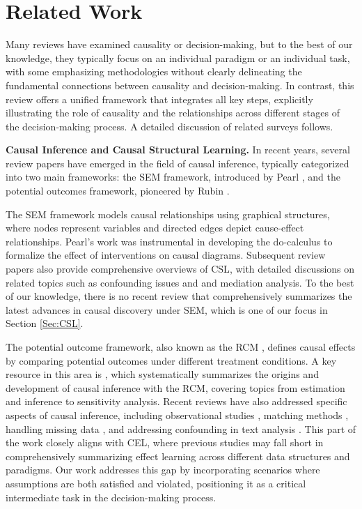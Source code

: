 \section{Related Work}
\label{sec::related_work}
Many reviews have examined causality or decision-making, but to the best of our knowledge, they typically focus on an individual paradigm or an individual task, with some emphasizing methodologies without clearly delineating the fundamental connections between causality and decision-making. In contrast, this review offers a unified framework that integrates all key steps, explicitly illustrating the role of causality and the relationships across different stages of the decision-making process. A detailed discussion of related surveys follows.

\noindent \textbf{Causal Inference and Causal Structural Learning.} In recent years, several review papers have emerged in the field of causal inference, typically categorized into two main frameworks: the \acrfull{SEM} framework, introduced by Pearl \citep{pearl1995causal}, and the potential outcomes framework, pioneered by Rubin \citep{rubin1974estimating, rubin1978bayesian}.

The \acrshort{SEM} framework models causal relationships using graphical structures, where nodes represent variables and directed edges depict cause-effect relationships. Pearl’s work \citep{pearl2003statistics} was instrumental in developing the do-calculus to formalize the effect of interventions on causal diagrams. Subsequent review papers \citep{pearl2009causal, pearl2010causal, pearl2010foundations} also provide comprehensive overviews of \acrshort{CSL}, with detailed discussions on related topics such as confounding issues and and mediation analysis. To the best of our knowledge, there is no recent review that comprehensively summarizes the latest advances in causal discovery under \acrshort{SEM}, which is one of our focus in Section \ref{Sec:CSL}.

The potential outcome framework, also known as the \acrfull{RCM} \citep{rubin1974estimating}, defines causal effects by comparing potential outcomes under different treatment conditions. A key resource in this area is \citet{imbens2015causal}, which systematically summarizes the origins and development of causal inference with the \acrshort{RCM}, covering topics from estimation and inference to sensitivity analysis. Recent reviews have also addressed specific aspects of causal inference, including observational studies \citep{yao2021survey}, matching methods \citep{stuart2010matching}, handling missing data \citep{ding2018causal}, and addressing confounding in text analysis \citep{keith2020text}. This part of the work closely aligns with \acrshort{CEL}, where previous studies may fall short in comprehensively summarizing effect learning across different data structures and paradigms. Our work addresses this gap by incorporating scenarios where assumptions are both satisfied and violated, positioning it as a critical intermediate task in the decision-making process.

